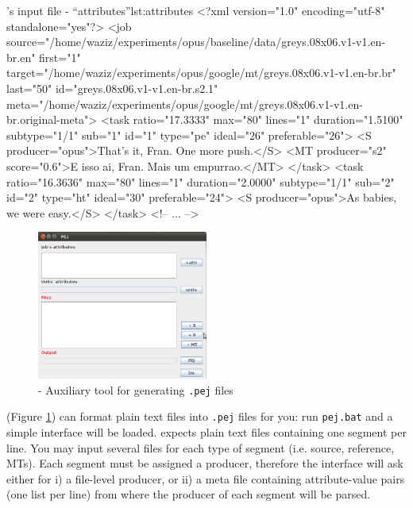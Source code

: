 \begin{workflow-code}{\PET's input file - ``attributes''}{lst:attributes}
<?xml version="1.0" encoding="utf-8" standalone="yes"?>
<job source="/home/waziz/experiments/opus/baseline/data/greys.08x06.v1-v1.en-br.en"
     first="1"
     target="/home/waziz/experiments/opus/google/mt/greys.08x06.v1-v1.en-br.br"
     last="50"
     id="greys.08x06.v1-v1.en-br.s2.1"
     meta="/home/waziz/experiments/opus/google/mt/greys.08x06.v1-v1.en-br.original-meta">
  <task ratio="17.3333"
        max="80"
        lines="1"
        duration="1.5100"
        subtype="1/1"
        sub="1"
        id="1"
        type="pe"
        ideal="26"
        preferable="26">
    <S producer="opus">That's it, Fran. One more push.</S>
    <MT producer="s2" score="0.6">E isso ai, Fran. Mais um empurrao.</MT>
  </task>
  <task ratio="16.3636"
        max="80"
        lines="1"
        duration="2.0000"
        subtype="1/1"
        sub="2"
        id="2"
        type="ht"
        ideal="30"
        preferable="24">
    <S producer="opus">As babies, we were easy.</S>
  </task>
  <!-- ... -->
 \end{workflow-code}


\begin{figure}[h]\label{fig:pejtool}
\centering
\includegraphics[width=0.5\textwidth]{img/PEJ}
\caption{\PEJ - Auxiliary tool for generating {\tt .pej} files}
\end{figure}


\PEJ (Figure \ref{fig:pejtool}) can format plain text files into {\tt .pej} files for you: run {\tt pej.bat} and a simple interface will be loaded.
\PEJ expects plain text files containing one segment per line. You may input several files for each type of segment (i.e. source, reference, MTs). Each segment must be assigned a producer, therefore the interface will ask either for i) a file-level producer, or ii) a meta file containing attribute-value pairs (one list per line) from where the producer of each segment will be parsed.

